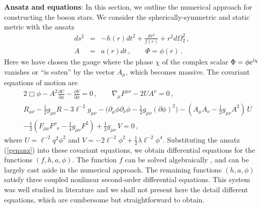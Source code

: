 \documentclass[11pt]{article}
\newcommand{\bea}{\setlength\arraycolsep{2pt} \begin{eqnarray}}
\newcommand{\eea}{\end{eqnarray}}
\newcommand{\nn}{\nonumber}
\def\ft#1#2{{\textstyle{\frac{\scriptstyle #1}{\scriptstyle #2} } }}
\def\fft#1#2{{\frac{#1}{#2}}}
\begin{document}
{\bf Ansatz and equations}: In this section, we outline the numerical approach for constructing the boson stars.  We consider the spherically-symmetric and static metric with the ansatz
\bea
ds^2 &=& - h(r) dt^2 + \fft{dr^2}{f(r)} + r^2 d\Omega_2^2\,,\nn\\
A &=& a(r) dt\,,\qquad \Phi=\phi(r)\,.\label{genanz}
\eea
Here we have chosen the gauge where the phase $\chi$ of the complex scalar $\Phi=\phi e^{{\rm i} \chi}$ vanishes or ``is eaten'' by the vector $A_\mu$, which becomes massive.  The covariant equations of motion are
\bea
&& 2\Box\phi - A^2\fft{\partial U}{\partial\phi} - \fft{\partial V}{\partial\phi}=0\,,\qquad
\nabla_\mu F^{\mu\nu} -2 U A^\nu=0\,,\nn\\
&&R_{\mu\nu} -\ft12 g_{\mu\nu} R -3\ell^{-2} g_{\mu\nu}- \big(\partial_\mu\phi\partial_\nu\phi - \ft12 g_{\mu\nu} (\partial \phi)^2\big) - (A_\mu A_\nu - \ft12 g_{\mu\nu} A^2)\,U\nn\\
&&-\ft12 (F_{\rho\mu} F^{\rho}{}_\nu - \ft14 g_{\mu\nu} F^2) + \ft12 g_{\mu\nu}\, V=0\,,\label{coveom}
\eea
where $U=\ell^{-2} q^2 \phi^2 $ and $V=-2\ell^{-2}\phi^2 + \fft12\lambda \ell^{-2} \phi^4$. Substituting the ansatz (\ref{genanz}) into these covariant equations, we obtain differential equations for the functions $(f,h,a,\phi)$.  The function $f$ can be solved algebraically \cite{Liu:2020uaz}, and can be largely cast aside in the numerical approach. The remaining functions $(h,a,\phi)$ satisfy three coupled nonlinear second-order differential equations. This system  was well studied in literature and we shall not present here the detail different equations, which are cumbersome but straightforward to obtain.
\end{document}
